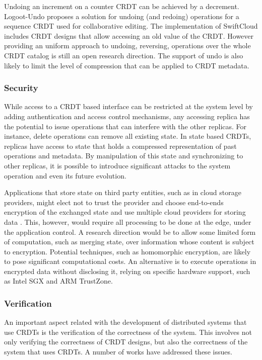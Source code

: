 \documentclass[12pt]{article}
\begin{document}
Undoing an increment on a counter CRDT can be achieved by a decrement. 
Logoot-Undo \cite{Weiss10LogootUndo} proposes a solution for undoing (and redoing) 
operations for a sequence CRDT used for collaborative editing.
The implementation of SwiftCloud \cite{swiftcloud} includes
CRDT designs that allow accessing an old value of the CRDT.   
However providing an uniform approach to undoing, reversing, operations over 
the whole CRDT catalog is still an open research direction. 
The support of undo is also likely to limit the level of compression that 
can be applied to CRDT metadata. 


\subsubsection{Security}
While access to a CRDT based interface can be restricted at the system level by 
adding authentication and access control mechanisms, 
any accessing replica has the potential to issue operations that can interfere 
with the other replicas. 
For instance, delete operations can remove all existing state. 
In state based CRDTs, replicas have access to state that holds a 
compressed representation of past operations and metadata. 
By manipulation of this state and synchronizing to other replicas, 
it is possible to introduce significant attacks to the system operation 
and even its future evolution. 

Applications that store state on third party entities, such as in 
cloud storage providers, might elect not to trust the provider and 
choose end-to-ends encryption of the exchanged state and use
multiple cloud providers for storing data \cite{depsky}. 
This, however, would require all processing to be done at the edge, 
under the application control. 
A research direction would be to allow some limited form of computation, 
such as merging state, over information whose content is subject to encryption. 
Potential techniques, such as homomorphic encryption, are likely to 
pose significant computational costs. 
An alternative is to execute operations in encrypted data without disclosing it, 
relying on specific hardware support, such as Intel SGX and ARM TrustZone.

\subsubsection{Verification}

An important aspect related with the development of distributed systems that 
use CRDTs is the verification of the correctness of the system. 
This involves not only verifying the correctness of CRDT designs, but also 
the correctness of the system that uses CRDTs. A number of works have addressed 
these issues. 
\end{document}
